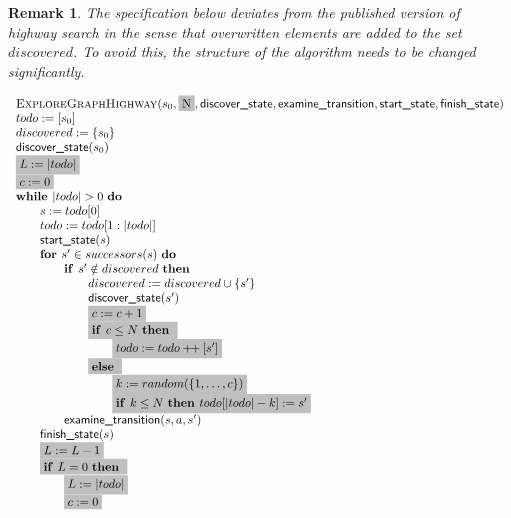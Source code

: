 \documentclass{article}
\newtheorem{remark}[theorem]{Remark}
\newcommand{\concat}{\ensuremath{+\!\!+\:}}
\newcommand{\Space}{\text{\ }}
\newcommand{\If}{\text{\textbf{if }}}
\newcommand{\Do}{\text{\textbf{do }}}
\newcommand{\Then}{\text{\textbf{then }}}
\newcommand{\Else}{\text{\textbf{else }}}
\newcommand{\For}{\text{\textbf{for }}}
\newcommand{\While}{\text{\textbf{while }}}
\begin{document}
\begin{remark}
The specification below deviates from the published version of highway search in the
sense that overwritten elements are added to the set $discovered$. To avoid this,
the structure of the algorithm needs to be changed significantly.
\end{remark}

\[
\begin{tabular}{l}
\textsc{ExploreGraphHighway}($s_0, \colorbox{lightgray}{N}, \textsf{discover\_state}, \textsf{examine\_transition}, \textsf{start\_state}, \textsf{finish\_state})$ \\
$todo := [s_0]$ \\
$discovered := \{ s_0 \}$ \\
$\textsf{discover\_state}(s_0)$ \\
\colorbox{lightgray}{$L := |todo|$} \\
\colorbox{lightgray}{$c := 0$} \\
$\While |todo| > 0$ \Do \\
\qquad $s := todo[0]$ \\
\qquad $todo := todo[1:|todo|]$ \\
\qquad $\textsf{start\_state}(s)$ \\
\qquad $\For s' \in successors(s)  \Space \Do$ \\
\qquad \qquad $\If s' \notin discovered \Space \Then$ \\
\qquad \qquad \qquad $discovered := discovered \cup \{s' \}$ \\
\qquad \qquad \qquad $\textsf{discover\_state}(s')$ \\
\qquad \qquad \qquad \colorbox{lightgray}{$c := c + 1$} \\
\qquad \qquad \qquad \colorbox{lightgray}{\If $c \leq N$ \Then} \\
\qquad \qquad \qquad \qquad \colorbox{lightgray}{$todo := todo \concat [s']$} \\
\qquad \qquad \qquad \colorbox{lightgray}{\Else} \\
\qquad \qquad \qquad \qquad \colorbox{lightgray}{$k := random(\{ 1, \ldots, c\})$} \\
\qquad \qquad \qquad \qquad \colorbox{lightgray}{$\If k \leq N \Space \Then todo[|todo| - k] := s'$} \\
\qquad \qquad $\textsf{examine\_transition}(s, a, s')$ \\
\qquad $\textsf{finish\_state}(s)$ \\
\qquad \colorbox{lightgray}{$L := L - 1$} \\
\qquad \colorbox{lightgray}{\If $L = 0$ \Then} \\
\qquad \qquad \colorbox{lightgray}{$L := |todo|$} \\
\qquad \qquad \colorbox{lightgray}{$c := 0$}
\end{tabular}
\]
\end{document}
